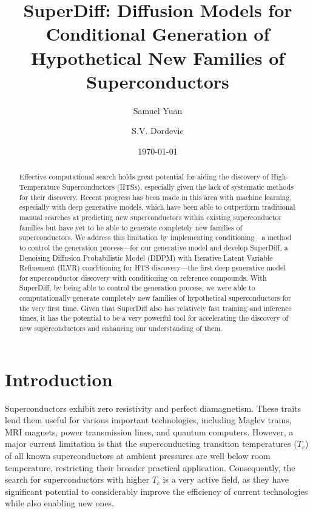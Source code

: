 \documentclass[%
reprint,
 amsmath,amssymb,
 aps,
prb,
]{revtex4-2}
\begin{document}
\title{SuperDiff: Diffusion Models for Conditional Generation of Hypothetical New Families of Superconductors}
\date{\today}

\author{Samuel Yuan}
 
 \author{S.V. Dordevic}

\begin{abstract}
Effective computational search holds great potential for aiding the discovery of High-Temperature Superconductors (HTSs), especially given the lack of systematic methods for their discovery. Recent progress has been made in this area with machine learning, especially with deep generative models, which have been able to outperform traditional manual searches at predicting new superconductors within existing superconductor families but have yet to be able to generate completely new families of superconductors. We address this limitation by implementing conditioning---a method to control the generation process---for our generative model and develop SuperDiff, a Denoising Diffusion Probabilistic Model (DDPM) with Iterative Latent Variable Refinement (ILVR) conditioning for HTS discovery---the first deep generative model for superconductor discovery with conditioning on reference compounds. With SuperDiff, by being able to control the generation process, we were able to computationally generate completely new families of hypothetical superconductors for the very first time. Given that SuperDiff also has relatively fast training and inference times, it has the potential to be a very powerful tool for accelerating the discovery of new superconductors and enhancing our understanding of them.
\end{abstract}



\maketitle


\section{Introduction}
\label{introduction}


Superconductors exhibit zero resistivity and perfect diamagnetism. These traits lend them useful for various important technologies, including Maglev trains, MRI magnets, power transmission lines, and quantum computers. However, a major current limitation is that the superconducting transition temperatures ($T_c$) of all known superconductors at ambient pressures are well below room temperature, restricting their broader practical application. Consequently, the search for superconductors with higher $T_c$ is a very active field, as they have significant potential to considerably improve the efficiency of current technologies while also enabling new ones.
\end{document}

